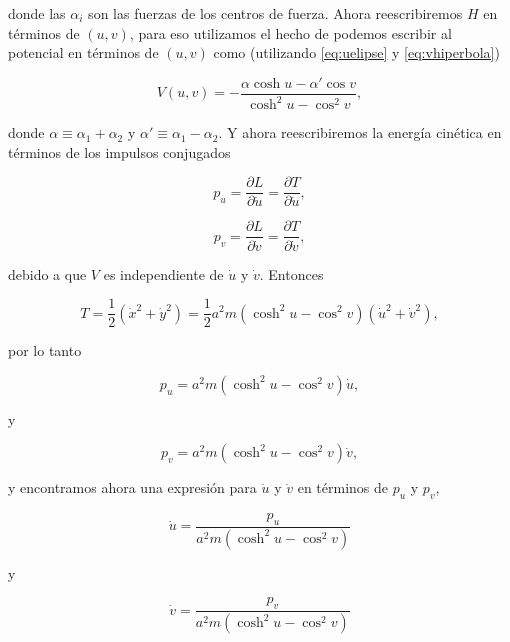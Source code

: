 \documentclass[a4paper,10pt]{article}
\numberwithin{equation}{section}
\begin{document}
donde las $\alpha_i$ son las fuerzas de los centros de fuerza. Ahora reescribiremos 
$H$ en términos de $(u,v)$, para eso utilizamos el hecho de podemos escribir al potencial 
en términos de $(u,v)$ como (utilizando \eqref{eq:uelipse} y \eqref{eq:vhiperbola})

\begin{equation}
 V(u,v) = - \frac{\alpha \cosh{u} - \alpha'\cos{v}}{\cosh^2{u}- \cos^2{v}},
\end{equation}

donde $\alpha \equiv \alpha_1 + \alpha_2$ y $\alpha' \equiv \alpha_1 - \alpha_2$. Y ahora 
reescribiremos la energía cinética en términos de los impulsos conjugados 

\begin{equation}
 p_u = \frac{\partial L}{\partial \dot{u}} = \frac{\partial T}{\partial \dot{u}},
\end{equation}

\begin{equation}
 p_v = \frac{\partial L}{\partial \dot{v}} = \frac{\partial T}{\partial \dot{v}},
\end{equation}

debido a que $V$ es independiente de $\dot{u}$ y $\dot{v}$. Entonces 

\begin{equation}
 T = \frac{1}{2} (\dot{x}^2 + \dot{y}^2) = \frac{1}{2}a^2m(\cosh^2{u} - \cos^2{v})
 (\dot{u}^2+\dot{v}^2),
\end{equation}

por lo tanto

\begin{equation}
 p_u = a^2m(\cosh^2{u} - \cos^2{v})\dot{u},
\end{equation}

y 

\begin{equation}
 p_v = a^2m(\cosh^2{u} - \cos^2{v})\dot{v},
\end{equation}

y encontramos ahora una expresión para $\dot{u}$ y $\dot{v}$ en términos de 
$p_u$ y $p_v$, 

\begin{equation}
 \dot{u} = \frac{p_u}{a^2m(\cosh^2{u} - \cos^2{v})}
\end{equation}

y 

\begin{equation}
 \dot{v} = \frac{p_v}{a^2m(\cosh^2{u} - \cos^2{v})}
\end{equation}
\end{document}

